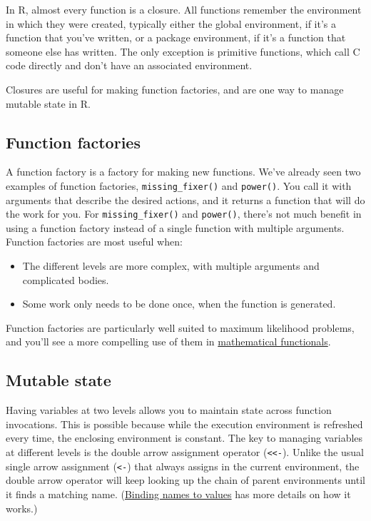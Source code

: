 In R, almost every function is a closure. All functions remember the
environment in which they were created, typically either the global
environment, if it's a function that you've written, or a package
environment, if it's a function that someone else has written. The only
exception is primitive functions, which call C code directly and don't
have an associated environment. 

Closures are useful for making function factories, and are one way to
manage mutable state in R.

\hypertarget{function-factories}{%
\subsection{Function factories}\label{function-factories}}

A function factory is a factory for making new functions. We've already
seen two examples of function factories, \texttt{missing\_fixer()} and
\texttt{power()}. You call it with arguments that describe the desired
actions, and it returns a function that will do the work for you. For
\texttt{missing\_fixer()} and \texttt{power()}, there's not much benefit
in using a function factory instead of a single function with multiple
arguments. Function factories are most useful when:

\begin{itemize}
\item
  The different levels are more complex, with multiple arguments and
  complicated bodies.
\item
  Some work only needs to be done once, when the function is generated.
\end{itemize}

Function factories are particularly well suited to maximum likelihood
problems, and you'll see a more compelling use of them in
\protect\hyperlink{functionals-math}{mathematical functionals}.

\hypertarget{mutable-state}{%
\subsection{Mutable state}\label{mutable-state}}

Having variables at two levels allows you to maintain state across
function invocations. This is possible because while the execution
environment is refreshed every time, the enclosing environment is
constant. The key to managing variables at different levels is the
double arrow assignment operator (\texttt{\textless{}\textless{}-}).
Unlike the usual single arrow assignment (\texttt{\textless{}-}) that
always assigns in the current environment, the double arrow operator
will keep looking up the chain of parent environments until it finds a
matching name. (\protect\hyperlink{binding}{Binding names to values} has
more details on how it works.) \indexc{<<-}

